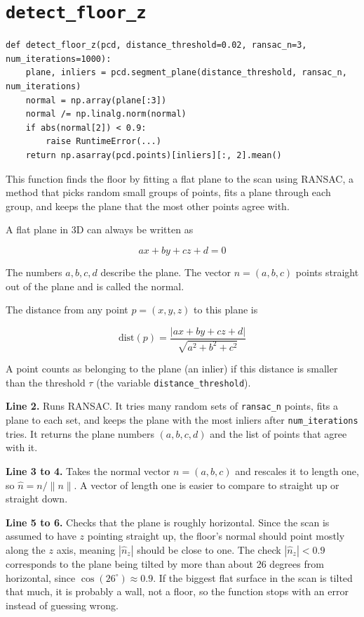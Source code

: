 \documentclass[11pt]{article}
\begin{document}
\section{\texttt{detect\_floor\_z}}

\begin{lstlisting}
def detect_floor_z(pcd, distance_threshold=0.02, ransac_n=3, num_iterations=1000):
    plane, inliers = pcd.segment_plane(distance_threshold, ransac_n, num_iterations)
    normal = np.array(plane[:3])
    normal /= np.linalg.norm(normal)
    if abs(normal[2]) < 0.9:
        raise RuntimeError(...)
    return np.asarray(pcd.points)[inliers][:, 2].mean()
\end{lstlisting}

This function finds the floor by fitting a flat plane to the scan using RANSAC, a method that picks random small groups of points, fits a plane through each group, and keeps the plane that the most other points agree with.

A flat plane in 3D can always be written as

\[
a x + b y + c z + d = 0
\]

The numbers $a, b, c, d$ describe the plane. The vector $n = (a, b, c)$ points straight out of the plane and is called the normal.

The distance from any point $p = (x, y, z)$ to this plane is

\[
\text{dist}(p) = \frac{|a x + b y + c z + d|}{\sqrt{a^2 + b^2 + c^2}}
\]

A point counts as belonging to the plane (an inlier) if this distance is smaller than the threshold $\tau$ (the variable \texttt{distance\_threshold}).

\textbf{Line 2.} Runs RANSAC. It tries many random sets of \texttt{ransac\_n} points, fits a plane to each set, and keeps the plane with the most inliers after \texttt{num\_iterations} tries. It returns the plane numbers $(a, b, c, d)$ and the list of points that agree with it.

\textbf{Line 3 to 4.} Takes the normal vector $n = (a, b, c)$ and rescales it to length one, so $\hat n = n / \lVert n \rVert$. A vector of length one is easier to compare to straight up or straight down.

\textbf{Line 5 to 6.} Checks that the plane is roughly horizontal. Since the scan is assumed to have $z$ pointing straight up, the floor's normal should point mostly along the $z$ axis, meaning $|\hat n_z|$ should be close to one. The check $|\hat n_z| < 0.9$ corresponds to the plane being tilted by more than about 26 degrees from horizontal, since $\cos(26^\circ) \approx 0.9$. If the biggest flat surface in the scan is tilted that much, it is probably a wall, not a floor, so the function stops with an error instead of guessing wrong.
\end{document}
